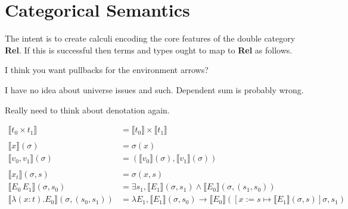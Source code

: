 \documentclass{scrartcl}
\newcommand{\Rel}{\textbf{Rel}}
\newcommand{\sat}{\mathbin{\otimes}}
\def\fCenter{\mathrel{\vdash}}
\newcommand{\update}{\mathbin{:=}}
\begin{document}
\section*{Categorical Semantics}

The intent is to create calculi encoding the core features of the
double category \Rel{}.  If this is successful then terms and types
ought to map to \Rel{} as follows.

I think you want pullbacks for the environment arrows?

\begin{center}
\end{center}

I have no idea about universe issues and such. Dependent sum is probably wrong.

Really need to think about denotation again.

\[
\begin{aligned}
  \llbracket t_0 \times t_1 \rrbracket & =\llbracket t_0 \rrbracket \times \llbracket t_1 \rrbracket \\
  \\
  \llbracket x \rrbracket(\sigma) & = \sigma(x) \\
  \llbracket v_0 , v_1 \rrbracket(\sigma) & =( \llbracket v_0 \rrbracket(\sigma) , \llbracket v_1 \rrbracket(\sigma) ) \\
  \\
  \llbracket x_t \rrbracket(\sigma, s) & = \sigma(x, s) \\
  \llbracket E_0 \, E_1 \rrbracket(\sigma, s_0) & = \exists s_1,  \llbracket E_1 \rrbracket (\sigma, s_1) \wedge \llbracket E_0 \rrbracket (\sigma, (s_1, s_0))\\
  \llbracket \lambda (x \colon t). E_0 \rrbracket(\sigma, (s_0, s_1)) & = \lambda E_1, \llbracket E_1 \rrbracket (\sigma, s_0) \rightarrow \llbracket E_0 \rrbracket ([x \update  s \mapsto \llbracket E_1 \rrbracket(\sigma, s)] \sigma, s_1) 
\end{aligned}
\]
\end{document}

